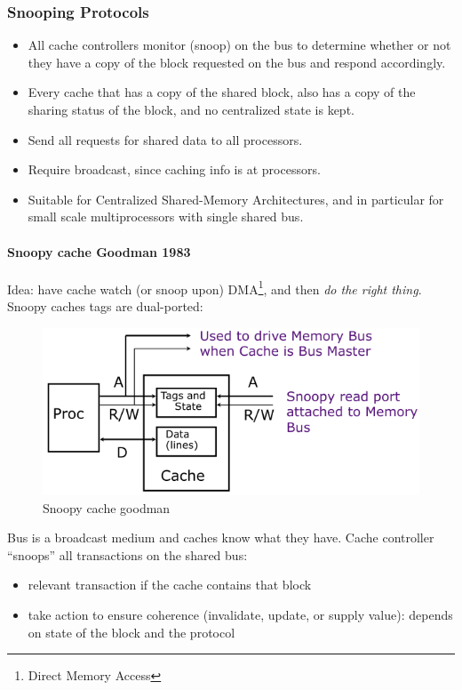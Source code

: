 \subsubsection{Snooping Protocols}
\begin{itemize}
    \item[\textrightarrow] All cache controllers monitor (snoop) on the bus to
    determine whether or not they have a copy of the block
    requested on the bus and respond accordingly.
    \item[\textrightarrow] Every cache that has a copy of the shared block, also
    has a copy of the sharing status of the block, and no
    centralized state is kept.
    \item[\textrightarrow]
    Send all requests for shared data to all processors.
    \item [\textrightarrow] Require broadcast, since caching info is at processors.
    \item [\textrightarrow] Suitable for Centralized Shared-Memory Architectures,
    and in particular for small scale multiprocessors with
    single shared bus.
\end{itemize}

\paragraph{Snoopy cache Goodman 1983}
Idea: have cache watch (or snoop upon) DMA\footnote{Direct Memory Access}, and then \textit{do the right thing}.
Snoopy caches tags are dual-ported:

\begin{figure}[h]
    \centering
    \includegraphics[scale = 0.4]{images/snoopy-cache-goodman}
    \caption{Snoopy cache goodman}
    \label{fig:snoopy-cache-goodman}
\end{figure}

Bus is a broadcast medium and caches know what
they have.
Cache controller “snoops” all transactions on the
shared bus:
\begin{itemize}
    \item relevant transaction if the cache contains that block
    \item take action to ensure coherence (\textrightarrow invalidate, update, or supply value):
    \subitem depends on state of the block and the protocol
\end{itemize}


